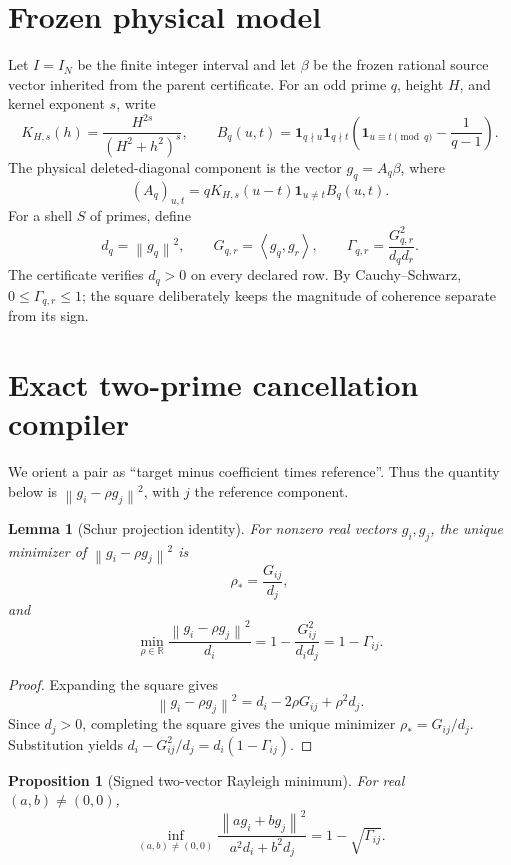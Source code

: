 \documentclass[10pt]{article}
\newtheorem{lemma}{Lemma}
\newtheorem{proposition}{Proposition}
\newcommand{\RR}{\mathbb R}
\newcommand{\norm}[1]{\left\lVert #1\right\rVert}
\newcommand{\ip}[2]{\left\langle #1,#2\right\rangle}
\begin{document}
\section{Frozen physical model}

Let $I=I_N$ be the finite integer interval and let $\beta$ be the frozen
rational source vector inherited from the parent certificate.  For an odd
prime $q$, height $H$, and kernel exponent $s$, write
\[
 K_{H,s}(h)=\frac{H^{2s}}{(H^2+h^2)^s},\qquad
 B_q(u,t)=\mathbf 1_{q\nmid u}\mathbf 1_{q\nmid t}
 \left(\mathbf 1_{u\equiv t\pmod q}-\frac1{q-1}\right).
\]
The physical deleted-diagonal component is the vector $g_q=A_q\beta$, where
\[
 (A_q)_{u,t}=qK_{H,s}(u-t)\mathbf 1_{u\ne t}B_q(u,t).
 \label{eq:model}
\]
For a shell $S$ of primes, define
\[
 d_q=\norm{g_q}^2,\qquad G_{q,r}=\ip{g_q}{g_r},
 \qquad \Gamma_{q,r}=\frac{G_{q,r}^2}{d_qd_r}.
 \label{eq:gram}
\]
The certificate verifies $d_q>0$ on every declared row.  By
Cauchy--Schwarz, $0\leq\Gamma_{q,r}\leq1$; the square deliberately keeps
the magnitude of coherence separate from its sign.

\section{Exact two-prime cancellation compiler}

We orient a pair as ``target minus coefficient times reference''.  Thus the
quantity below is $\norm{g_i-\rho g_j}^2$, with $j$ the reference component.

\begin{lemma}[Schur projection identity]
For nonzero real vectors $g_i,g_j$, the unique minimizer of
$\norm{g_i-\rho g_j}^2$ is
\[
 \rho_* = \frac{G_{ij}}{d_j},
 \]
and
\begin{equation}
 \min_{\rho\in\RR}\frac{\norm{g_i-\rho g_j}^2}{d_i}
 =1-\frac{G_{ij}^2}{d_i d_j}=1-\Gamma_{ij}.
 \label{eq:schur}
\end{equation}
\end{lemma}

\begin{proof}
Expanding the square gives
\[
 \norm{g_i-\rho g_j}^2=d_i-2\rho G_{ij}+\rho^2d_j.
\]
Since $d_j>0$, completing the square gives the unique minimizer
$\rho_*=G_{ij}/d_j$.  Substitution yields
$d_i-G_{ij}^2/d_j=d_i(1-\Gamma_{ij})$.
\end{proof}

\begin{proposition}[Signed two-vector Rayleigh minimum]
For real $(a,b)\ne(0,0)$,
\begin{equation}
 \inf_{(a,b)\ne(0,0)}
 \frac{\norm{a g_i+b g_j}^2}{a^2d_i+b^2d_j}
 =1-\sqrt{\Gamma_{ij}}.
 \label{eq:rayleigh}
\end{equation}
\end{proposition}
\end{document}
